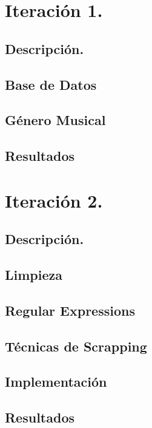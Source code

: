 \documentclass[12pt, a4paper, titlepage]{report}
\begin{document}
\chapter{\textcolor{azulescom}{Iteración 1.}}
\section{Descripción.}
\section{Base de Datos} %
\section{Género Musical} %
\section{Resultados}
\chapter{\textcolor{azulescom}{Iteración 2.}}
\section{Descripción.}
\section{Limpieza} %
\section{Regular Expressions} %
\section{Técnicas de Scrapping} %
\section{Implementación} %
\section{Resultados} %
\newpage
\end{document}
